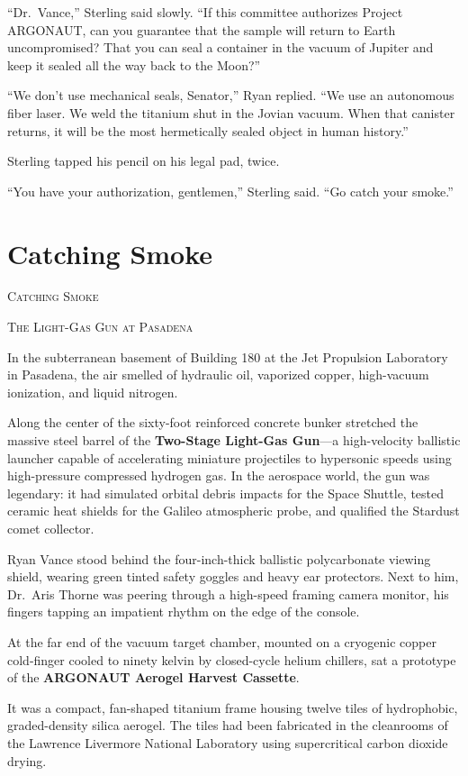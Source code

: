 \documentclass[12pt,twoside,openright]{book}
\newcommand{\sceneheader}[1]{%
  \par\vspace{1.8em}%
  {\noindent\centering\scshape\large #1\par}%
  \vspace{1.0em}%
  \noindent%
}
\begin{document}
``Dr.~Vance,'' Sterling said slowly. ``If this committee authorizes
Project ARGONAUT, can you guarantee that the sample will return to Earth
uncompromised? That you can seal a container in the vacuum of Jupiter
and keep it sealed all the way back to the Moon?''

``We don't use mechanical seals, Senator,'' Ryan replied. ``We use an
autonomous fiber laser. We weld the titanium shut in the Jovian vacuum.
When that canister returns, it will be the most hermetically sealed
object in human history.''

Sterling tapped his pencil on his legal pad, twice.

``You have your authorization, gentlemen,'' Sterling said. ``Go catch
your smoke.''

\chapter{Catching Smoke}
\sceneheader{Catching Smoke}

\sceneheader{The Light-Gas Gun at
Pasadena}

In the subterranean basement of Building 180 at the Jet Propulsion
Laboratory in Pasadena, the air smelled of hydraulic oil, vaporized
copper, high-vacuum ionization, and liquid nitrogen.

Along the center of the sixty-foot reinforced concrete bunker stretched
the massive steel barrel of the \textbf{Two-Stage Light-Gas Gun}---a
high-velocity ballistic launcher capable of accelerating miniature
projectiles to hypersonic speeds using high-pressure compressed hydrogen
gas. In the aerospace world, the gun was legendary: it had simulated
orbital debris impacts for the Space Shuttle, tested ceramic heat
shields for the Galileo atmospheric probe, and qualified the Stardust
comet collector.

Ryan Vance stood behind the four-inch-thick ballistic polycarbonate
viewing shield, wearing green tinted safety goggles and heavy ear
protectors. Next to him, Dr.~Aris Thorne was peering through a
high-speed framing camera monitor, his fingers tapping an impatient
rhythm on the edge of the console.

At the far end of the vacuum target chamber, mounted on a cryogenic
copper cold-finger cooled to ninety kelvin by closed-cycle helium
chillers, sat a prototype of the \textbf{ARGONAUT Aerogel Harvest
Cassette}.

It was a compact, fan-shaped titanium frame housing twelve tiles of
hydrophobic, graded-density silica aerogel. The tiles had been
fabricated in the cleanrooms of the Lawrence Livermore National
Laboratory using supercritical carbon dioxide drying.
\end{document}
